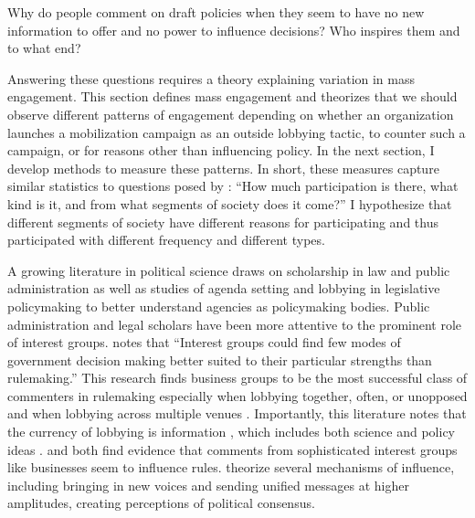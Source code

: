
Why do people comment on draft policies when they seem to have no new information to offer and no power to influence decisions? Who inspires them and to what end? 

Answering these questions requires a theory explaining variation in mass engagement.  
This section defines mass engagement and theorizes that we should observe different patterns of engagement depending on whether an organization launches a mobilization campaign as an outside lobbying tactic, to counter such a campaign, or for reasons other than influencing policy. In the next section, I develop methods to measure these patterns. In short, these measures capture similar statistics to questions posed by \citet[p. 9]{Verba1987}: ``How much participation is there, what kind is it, and from what segments of society does it come?'' I hypothesize that different segments of society have different reasons for participating and thus participated with different frequency and different types. 

A growing literature in political science draws on scholarship in law and public administration as well as studies of agenda setting and lobbying in legislative policymaking to better understand agencies as policymaking bodies. Public administration and legal scholars have been more attentive to the prominent role of interest groups. \citet{Kerwin2011} notes that ``Interest groups could find few modes of government decision making better suited to their particular strengths than rulemaking.'' This research finds business groups to be the most successful class of commenters in rulemaking \citep{Yackee2006JOP} especially when lobbying together, often, or unopposed \citep{Nelson2012} and when lobbying across multiple venues \citep{Yackee2015JPART}. Importantly, this literature notes that the currency of lobbying is information \citep{Hall2006, Carpenter1998, Yackee2006JPART, Yackee2012}, which includes both science and policy ideas \citep{Jones2005}. \citet{Kirilenko2014} and \citet{Yackee2006JOP} both find evidence that comments from sophisticated interest groups like businesses seem to influence rules. %
\citet{Yackee2006JOP} theorize several mechanisms of influence, including bringing in new voices and sending unified messages at higher amplitudes, creating perceptions of political consensus.

